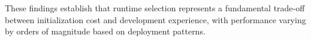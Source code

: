 These findings establish that runtime selection represents a fundamental trade-off between initialization cost and development experience, with performance varying by orders of magnitude based on deployment patterns.


